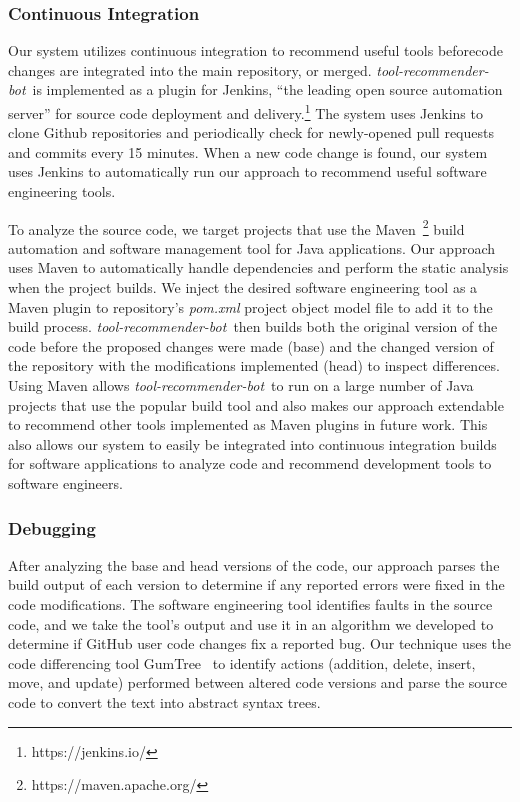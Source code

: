 \documentclass[sigconf,review,anonymous]{acmart}
\newcommand{\tool}{\textsl{tool-recommender-bot}}
\begin{document}
\subsubsection{Continuous Integration}

Our system utilizes continuous integration to recommend useful tools beforecode changes are integrated into the main repository, or merged. \tool~is implemented as a plugin for Jenkins, ``the leading open source automation server'' for source code deployment and delivery.\footnote{https://jenkins.io/} The system uses Jenkins to clone Github repositories and periodically check for newly-opened pull requests and commits every 15 minutes. When a new code change is found, our system uses Jenkins to automatically run our approach to recommend useful software engineering tools.

To analyze the source code, we target projects that use the Maven~\footnote{https://maven.apache.org/} build automation and software management tool for Java applications. Our approach uses Maven to automatically handle dependencies and perform the static analysis when the project builds. We inject the desired software engineering tool as a Maven plugin to repository's \textit{pom.xml} project object model file to add it to the build process. \tool~then builds both the original version of the code before the proposed changes were made (base) and the changed version of the repository with the modifications implemented (head) to inspect differences. Using Maven allows \tool~to run on a large number of Java projects that use the popular build tool and also makes our approach extendable to recommend other tools implemented as Maven plugins in future work. This also allows our system to easily be integrated into continuous integration builds for software applications to analyze code and recommend development tools to software engineers.

\subsubsection{Debugging}

After analyzing the base and head versions of the code, our approach parses the build output of each version to determine if any reported errors were fixed in the code modifications. The software engineering tool identifies faults in the source code, and we take the tool's output and use it in an algorithm we developed to determine if GitHub user code changes fix a reported bug. Our technique uses the code differencing tool GumTree~\cite{GumTree} to identify actions (addition, delete, insert, move, and update) performed between altered code versions and parse the source code to convert the text into abstract syntax trees. 
\end{document}
